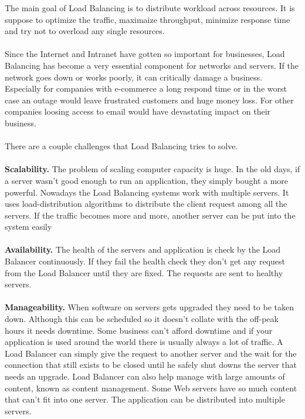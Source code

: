 \documentclass[12p]{article}
\begin{document}
	
	The main goal of Load Balancing is to distribute workload across resources. It is suppose to optimize the traffic, maximaize throughput, minimize response time and try not to overload any single resources. \\\\
	Since the Internet and Intranet have gotten so important for businesses, Load Balancing has become a very essential component for networks and servers. If the network goes down or works poorly, it can critically damage a business. Especially for companies with e-commerce a long respond time or in the worst case an outage would leave frustrated customers and huge money loss. For other companies loosing access to email would have devastating impact on their business.  \cite{lb_SFC} \\\\
	There are a couple challenges that Load Balancing tries to solve. \\\\ 
	\textbf{Scalability.} The problem of scaling computer capacity is huge. In the old days, if a server wasn't good enough to run an application, they simply bought a more powerful. Nowadays the Load Balancing systems work with multiple servers. It uses load-distribution algorithms to distribute the client request among all the servers.
	If the traffic becomes more and more, another server can be put into the system easily \cite{lb_SFC} \\\\
	\textbf{Availability.} The health of the servers and application is check by the Load Balancer continuously. If they fail the health check they don't get any request from the Load Balancer until they are fixed. The requests are sent to healthy servers.\cite{lb_SFC}\\\\ 
	\textbf{Manageability.} When software on servers gets upgraded they need to be taken down. Although this can be scheduled so it doesn't collate with the off-peak hours it needs downtime. Some business can't afford downtime and if your application is used around the world there is usually always a lot of traffic. A Load Balancer can simply give the request to another server and the wait for the connection that still exists to be closed until he safely shut downs the server that needs an upgrade. 
	Load Balancer can also help manage with large amounts of content, known as content management. Some Web servers have so much content that can't fit into one server. The application can be distributed into multiple servers.\cite{lb_SFC}\\\\
\end{document}
